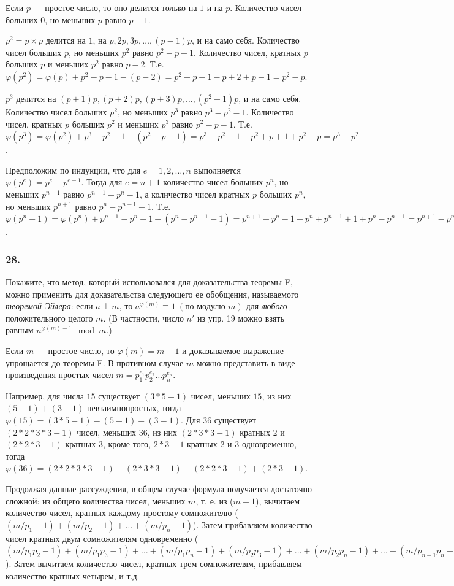 \documentclass{book}
\begin{document}
Если $p$ --- простое число, то оно делится только на $1$ и на $p$. Количество чисел больших $0$, но меньших $p$ равно $p-1$.

$p^2=p\times p$ делится на $1$, на $p,2p,3p,\ldots,(p-1)p$,  и на само себя. Количество чисел больших $p$, но меньших $p^2$ равно $p^2-p-1$. Количество чисел, кратных $p$ больших $p$ и меньших $p^2$ равно $p-2$. Т.е. $\varphi(p^2)=\varphi(p)+p^2-p-1-(p-2)=p^2-p-1-p+2+p-1=p^2-p$.

$p^3$ делится на $(p+1)p,(p+2)p,(p+3)p,\ldots,(p^2-1)p$,  и на само себя. Количество чисел больших $p^2$, но меньших $p^3$ равно $p^3-p^2-1$. Количество чисел, кратных $p$ больших $p^2$ и меньших $p^3$ равно $p^2-p-1$. Т.е. $\varphi(p^3)=\varphi(p^2)+p^3-p^2-1-(p^2-p-1)=p^3-p^2-1-p^2+p+1+p^2-p=p^3-p^2$.

Предположим по индукции, что для $e=1,2,\ldots,n$ выполняется $\varphi(p^e)=p^e-p^{e-1}$. Тогда для $e=n+1$ количество чисел больших $p^n$, но меньших $p^{n+1}$ равно $p^{n+1}-p^n-1$, а количество чисел кратных $p$ больших $p^n$, но меньших $p^{n+1}$ равно $p^n-p^{n-1}-1$. Т.е. $\varphi(p^n+1)=\varphi(p^n)+p^{n+1}-p^n-1-(p^n-p^{n-1}-1)=p^{n+1}-p^n-1-p^{n}+p^{n-1}+1+p^n-p^{n-1}=p^{n+1}-p^n$.

\subsubsection{28.}
Покажите, что метод, который использовался для доказательства теоремы F, можно применить для доказательства следующего ее обобщения, называемого \emph{теоремой Эйлера}: если $a\perp m$, то $a^{\varphi(m)}\equiv 1\ (\textrm{по модулю }m)$ для \emph{любого} положительного целого $m$. (В частности, число $n'$ из упр. 19 можно взять равным $n^{\varphi(m)-1}\mod m$.)

Если $m$ --- простое число, то $\varphi(m)=m-1$ и доказываемое выражение упрощается до теоремы F. В противном случае $m$ можно представить в виде произведения простых чисел $m=p_1^{e_1}p_2^{e_2}\ldots p_n^{e_n}$.

Например, для числа $15$ существует $(3*5-1)$ чисел, меньших $15$, из них $(5-1)+(3-1)$ невзаимнопростых, тогда $\varphi(15)=(3*5-1)-(5-1)-(3-1)$. Для $36$ существует $(2*2*3*3-1)$ чисел, меньших $36$, из них $(2*3*3-1)$ кратных $2$ и $(2*2*3-1)$ кратных $3$, кроме того, $2*3-1$ кратных $2$ и $3$ одновременно, тогда $\varphi(36)=(2*2*3*3-1)-(2*3*3-1)-(2*2*3-1)+(2*3-1)$.

Продолжая данные рассуждения, в общем случае формула получается достаточно сложной: из общего количества чисел, меньших $m$, т. е. из ($m-1$), вычитаем количество чисел, кратных каждому простому сомножителю ($(m/p_1-1)+(m/p_2-1)+\ldots+(m/p_n-1)$). Затем прибавляем количество чисел кратных двум сомножителям одновременно ($(m/p_1p_2-1)+(m/p_1p_3-1)+\ldots+(m/p_1p_n-1)+(m/p_2p_3-1)+...+(m/p_2p_n-1)+...+(m/p_{n-1}p_n-1)$). Затем вычитаем количество чисел, кратных трем сомножителям, прибавляем количество кратных четырем, и т.д.
\end{document}
